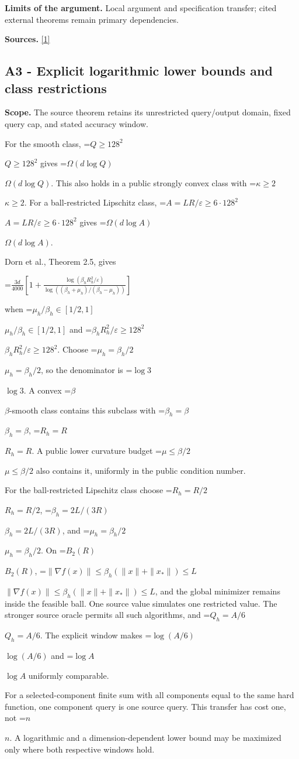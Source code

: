 \documentclass[10pt,a4paper]{article}
\newcommand{\AtlasMath}[1]{\par\begingroup\centering\setbox0=\hbox{$\displaystyle #1$}\ifdim\wd0>1.4\linewidth\typeout{ATLAS WIDE FORMULA: \the\wd0}\fi\ifdim\wd0>\linewidth\resizebox{\linewidth}{!}{\box0}\else\box0\fi\par\endgroup}
\newcommand{\AtlasInlineMath}[1]{\begingroup\setbox0=\hbox{$#1$}\ifdim\wd0>.4\linewidth\endgroup\AtlasMath{#1}\else\endgroup$#1$\fi}
\begin{document}
\textbf{Limits of the argument.} Local argument and specification transfer; cited external theorems remain primary dependencies.

\textbf{Sources.} \href{https://arxiv.org/html/2610.00345v1}{[1]}

\subsection{A3 - Explicit logarithmic lower bounds and class restrictions}
\textbf{Scope.} The source theorem retains its unrestricted query/output domain, fixed query cap, and stated accuracy window.

For the smooth class, \AtlasInlineMath{Q\ge128^2} gives \AtlasInlineMath{\Omega(d\log Q)}. This also holds in a public strongly convex class with \AtlasInlineMath{\kappa\ge2}. For a ball-restricted Lipschitz class, \AtlasInlineMath{A=LR/\varepsilon\ge6\cdot128^2} gives \AtlasInlineMath{\Omega(d\log A)}.

Dorn et al., Theorem 2.5, gives



\AtlasMath{\frac{3d}{4000}\left[1+\frac{\log(\beta_hR_h^2/\varepsilon)}{\log((\beta_h+\mu_h)/(\beta_h-\mu_h))}\right]}



when \AtlasInlineMath{\mu_h/\beta_h\in[1/2,1]} and \AtlasInlineMath{\beta_hR_h^2/\varepsilon\ge128^2}. Choose \AtlasInlineMath{\mu_h=\beta_h/2}, so the denominator is \AtlasInlineMath{\log3}. A convex \AtlasInlineMath{\beta}-smooth class contains this subclass with \AtlasInlineMath{\beta_h=\beta}, \AtlasInlineMath{R_h=R}. A public lower curvature budget \AtlasInlineMath{\mu\le\beta/2} also contains it, uniformly in the public condition number.

For the ball-restricted Lipschitz class choose \AtlasInlineMath{R_h=R/2}, \AtlasInlineMath{\beta_h=2L/(3R)}, and \AtlasInlineMath{\mu_h=\beta_h/2}. On \AtlasInlineMath{B_2(R)}, \AtlasInlineMath{\|\nabla f(x)\|\le\beta_h(\|x\|+\|x_*\|)\le L}, and the global minimizer remains inside the feasible ball. One source value simulates one restricted value. The stronger source oracle permits all such algorithms, and \AtlasInlineMath{Q_h=A/6}. The explicit window makes \AtlasInlineMath{\log(A/6)} and \AtlasInlineMath{\log A} uniformly comparable.

For a selected-component finite sum with all components equal to the same hard function, one component query is one source query. This transfer has cost one, not \AtlasInlineMath{n}. A logarithmic and a dimension-dependent lower bound may be maximized only where both respective windows hold.
\end{document}
